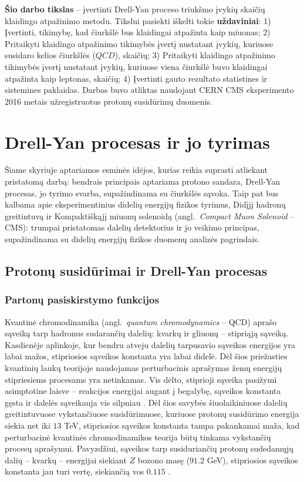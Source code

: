 \documentclass[a4paper, 12pt, oneside]{article}
\newcommand{\QCD}{QC\! D}
\newlength\q
\begin{document}
\textbf{Šio darbo tikslas} -- įvertinti Drell-Yan proceso triukšmo įvykių skaičių klaidingo atpažinimo metodu.
Tikslui pasiekti iškelti tokie \textbf{uždaviniai}:
1) Įvertinti, tikimybę, kad čiurkšlė bus klaidingai atpažinta kaip miuonas;
2) Pritaikyti klaidingo atpažinimo tikimybės įvertį nustatant įvykių, kuriuose susidaro kelios čiurkšlės ($\QCD$), skaičių;
3) Pritaikyti klaidingo atpažinimo tikimybės įvertį nustatant įvykių, kuriuose viena čiurkšlė buvo klaidingai atpažinta kaip leptonas, skaičių;
4) Įvertinti gauto rezultato statistines ir sistemines paklaidas.
Darbas buvo atliktas naudojant CERN CMS eksperimento 2016 metais užregistruotus protonų susidūrimų duomenis.

\section{Drell-Yan procesas ir jo tyrimas}

Šiame skyriuje aptariamos esminės idėjos, kurias reikia suprasti atliekant pristatomą darbą:
bendrais principais aptariama protono sandara, Drell-Yan procesas, jo tyrimo svarba, supažindinama su čiurkšlės sąvoka.
Taip pat bus kalbama apie eksperimentinius didelių energijų fizikos tyrimus, Didįjį hadronų
greitintuvą ir Kompaktiškąjį miuonų solenoidą (angl.\ \textit{Compact Muon Solenoid} -- CMS):
trumpai pristatomas dalelių detektorius ir jo veikimo principas, supažindinama su didelių energijų fizikos duomenų analizės pagrindais.

\subsection{Protonų susidūrimai ir Drell-Yan procesas}

\subsubsection{Partonų pasiskirstymo funkcijos}

Kvantinė chromodinamika (angl.\ \textit{quantum chromodynamics} -- QCD)  aprašo sąveiką tarp hadronus sudarančių dalelių:
kvarkų ir gliuonų -- stipriąją sąveiką.
Kasdienėje aplinkoje, kur bendru atveju dalelių tarpusavio sąveikos energijos yra labai mažos,
stipriosios sąveikos konstanta yra labai didelė.
Dėl šios priežasties kvantinių laukų teorijoje naudojamas perturbacinis aprašymas žemų energijų stipriesiems procesams
yra netinkamas.
Vis dėlto, stiprioji sąveika pasižymi asimptotine laisve -- reakcijos energijai augant į begalybę, sąveikos konstanta
gęsta ir dalelės sąveikauja vis silpniau \cite{AFreedom}.
Dėl šios savybės šiuolaikiniuose dalelių greitintuvuose vykstančiuose susidūrimuose, kuriuose protonų susidūrimo energija
siekia net iki $13$ TeV, stipriosios sąveikos konstanta tampa pakankamai maža, kad perturbacinė kvantinės chromodinamikos
teorija būtų tinkama vykstančių procesų aprašymui.
Pavyzdžiui, sąveikos tarp susiduriančių protonų sudedamųjų dalių -- kvarkų -- energijai siekiant $Z$ bozono masę ($91.2$ GeV),
stipriosios sąveikos konstanta jau turi vertę, siekiančią vos $0.115$ \cite{PDF_ABMP16}.
\end{document}
